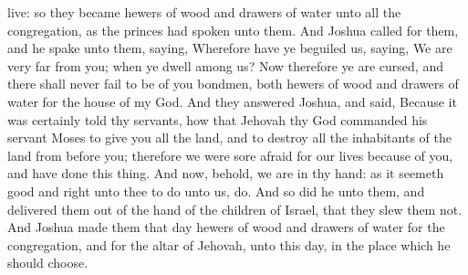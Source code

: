 live: so they became hewers of wood and drawers of water unto all the congregation, as the princes had spoken unto them.  And Joshua called for them, and he spake unto them, saying, Wherefore have ye beguiled us, saying, We are very far from you; when ye dwell among us? Now therefore ye are cursed, and there shall never fail to be of you bondmen, both hewers of wood and drawers of water for the house of my God. And they answered Joshua, and said, Because it was certainly told thy servants, how that Jehovah thy God commanded his servant Moses to give you all the land, and to destroy all the inhabitants of the land from before you; therefore we were sore afraid for our lives because of you, and have done this thing. And now, behold, we are in thy hand: as it seemeth good and right unto thee to do unto us, do. And so did he unto them, and delivered them out of the hand of the children of Israel, that they slew them not. And Joshua made them that day hewers of wood and drawers of water for the congregation, and for the altar of Jehovah, unto this day, in the place which he should choose. 

